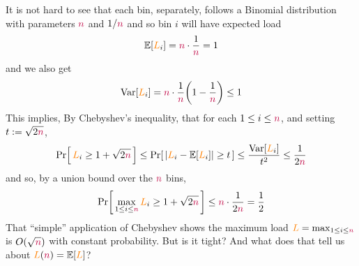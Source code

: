 It is not hard to see that each bin, separately, follows a Binomial distribution with parameters $\textcolor{purple}{n}$ and $1/\textcolor{purple}{n}$ and so bin $i$ will have expected load 
\[
\expect{\orange{L}_i} = \nbins\cdot \frac{1}{\nbins} = 1
\]and we also get 
\[
\var[\orange{L}_i] = \nbins\cdot \frac{1}{\nbins}\Paren{1-\frac{1}{\nbins}} \leq 1
\]
This implies, By Chebyshev's inequality, that for each $1\leq i\leq \textcolor{purple}{n}$, and setting $t := \sqrt{2\textcolor{purple}{n}}$,
\[
\probaOf{ \orange{L}_i \geq 1+\sqrt{2\nbins} } \leq \probaOf{ |\orange{L}_i - \expect{\orange{L}_i}| \geq t } \leq \frac{\var[\orange{L}_i]}{t^2} \leq \frac{1}{2\nbins}
\]
and so, by a union bound over the $\textcolor{purple}{n}$ bins, 
\[
\probaOf{ \max_{1\leq i\leq\nbins}\orange{L}_i \geq 1+\sqrt{2\nbins} } \leq \nbins\cdot \frac{1}{2\nbins} =  \frac{1}{2}
\]
That ``simple'' application of Chebyshev shows the maximum load $\textcolor{orange}{L} = \max_{1\leq i\leq\textcolor{purple}{n}}$ is $O(\sqrt{\textcolor{purple}{n}})$ with constant probability. But is it tight? And what does that tell us about $\orange{L}(\nbins)=\expect{\orange{L}}$?\medskip

